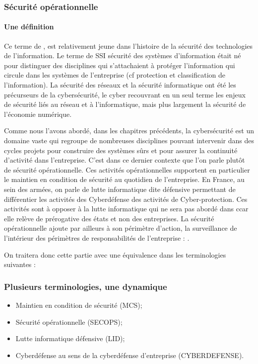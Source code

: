 \begin{frame}
\frametitle<presentation>{Sécurité opérationnelle}
\framesubtitle<presentation>{Une définition}
 Ce terme de , est relativement jeune dans l’histoire de la sécurité des technologies de l’information. Le terme de SSI sécurité des systèmes d’information était né pour distinguer des disciplines qui s’attachaient à protéger l’information qui circule dans les systèmes de l’entreprise (cf protection et classification de l’information). La sécurité des réseaux et la sécurité informatique ont été les précurseurs de la cybersécurité, le cyber recouvrant en un seul terme les enjeux de sécurité liés au réseau et à l’informatique, mais plus largement la sécurité de l'économie numérique.
\end{frame}

Comme nous l’avons abordé, dans les chapitres précédents, la cybersécurité est un domaine vaste qui regroupe de nombreuses disciplines pouvant intervenir dans des cycles projets pour construire des systèmes sûrs et pour assurer la continuité d’activité dans l'entreprise.
C’est dans ce dernier contexte que l’on parle plutôt de sécurité opérationnelle. Ces activités opérationnelles supportent en particulier le maintien en condition de sécurité au quotidien de l’entreprise. En France, au sein des armées, on parle de lutte informatique dite défensive permettant de différentier les activités des Cyberdéfense des activités de Cyber-protection. Ces activités sont à opposer à la lutte informatique qui ne sera pas abordé dans c\ecours car elle relève de prérogative des états et non des entreprises.
La sécurité opérationnelle ajoute par ailleurs à son périmètre d'action, la surveillance de l'intérieur des périmètres de responsabilités de l'entreprise : .

On traitera donc cette partie avec une équivalence dans les terminologies suivantes :

\begin{frame}
\frametitle<presentation>{Plusieurs terminologies, une dynamique}
	\begin{itemize}
		\item Maintien en condition de sécurité (MCS);
		\item Sécurité opérationnelle (SECOPS);
		\item Lutte informatique défensive (LID);
		\item Cyberdéfense au sens de la cyberdéfense d'entreprise (CYBERDEFENSE).
	\end{itemize}
\end{frame}

